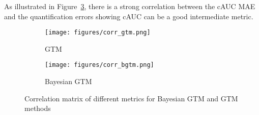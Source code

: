 As illustrated in Figure~\ref{fig:corr_mat}, there is a strong correlation between the cAUC MAE and the quantification errors showing cAUC can be a good intermediate metric.

\begin{figure}[h]
	\centering
	\begin{subfigure}{0.45\textwidth}
		\texttt{[image: figures/corr\_gtm.png]}
		\caption{GTM}
		\label{subfig:corr_gtm}
	\end{subfigure}
	\begin{subfigure}{0.45\textwidth}
		\texttt{[image: figures/corr\_bgtm.png]}
		\caption{Bayesian GTM}
		\label{subfig:corr_bgtm}
	\end{subfigure}
	\caption{Correlation matrix of different metrics for Bayesian GTM and GTM methods}
	\label{fig:corr_mat}
\end{figure}



